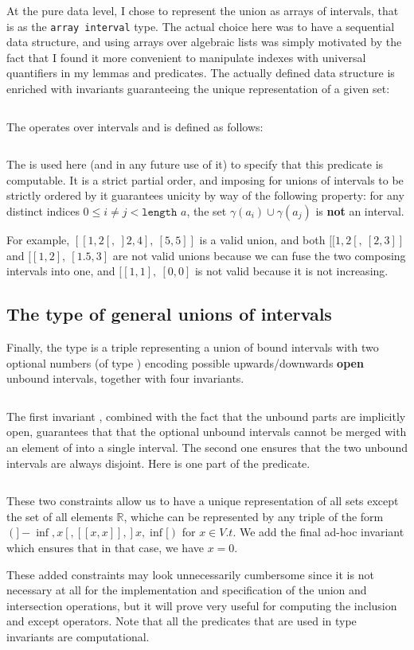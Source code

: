 At the pure data level, I chose to represent the union as arrays of intervals, that
is as the \texttt{array interval} type.
%
The actual choice here was to have a sequential data structure, and using
arrays over algebraic lists was simply motivated by the fact that I found it more
convenient to manipulate indexes with universal quantifiers in my lemmas and predicates.
%
The actually defined data structure is enriched with invariants guaranteeing the
unique representation of a given set:
%
\inputminted{\whyml}{why3code/bound_union_type.mlw}
The \minline{(<<)} operates over intervals and is defined as follows:
%
\inputminted{\whyml}{why3code/before_interval_pred.mlw}
%
The  is used here (and in any future use of it) to specify that this
predicate is computable.
%
It is a strict partial order, and imposing for unions of intervals to be strictly
ordered by it guarantees unicity by way of the following property: for any distinct
indices $0 \le i \neq j < \texttt{length } a$, the set $\gamma(a_i) \cup \gamma(a_j)$
is \textbf{not} an interval.

For example, $[[1, 2[,~]2, 4],~[5, 5]]$ is a valid union, and both
$[[1, 2[,~[2, 3]]$ and $[[1, 2],~[1.5, 3]$ are not valid unions because we
can fuse the two composing intervals into one, and $[[1, 1],~[0,0]$ is not valid
because it is not increasing.


\subsection{The type of general unions of intervals}
Finally, the type  is a triple representing a union of bound intervals
with two optional numbers (of type ) encoding possible
upwards/downwards \textbf{open} unbound intervals, together with four invariants.
%
\inputminted{\whyml}{why3code/u_type.mlw}
%
The first invariant , combined with the fact that the
unbound parts are implicitly open, guarantees that that the optional unbound
intervals cannot be merged with an element of  into a single interval.
The second one  ensures that the two unbound intervals
are always disjoint. Here is one part of the  predicate.
%
\inputminted{\whyml}{why3code/bound_unbound_disj_pred.mlw}
%
These two constraints allow us to have a unique representation of all sets except the
set of all elements $\mathbb{R}$, whiche can be represented by any triple of the
form $(]-\inf, x[, [[x,x]], ]x, \inf[)$ for $x\in V.t$.
%
We add the final ad-hoc invariant  which ensures that in
that case, we have $x = 0$.

These added constraints may look unnecessarily cumbersome since it is not necessary at
all for the implementation and specification of the union and intersection
operations, but it will prove very useful for computing the inclusion and except
operators.
%
Note that all the predicates that are used in type invariants are
computational.
